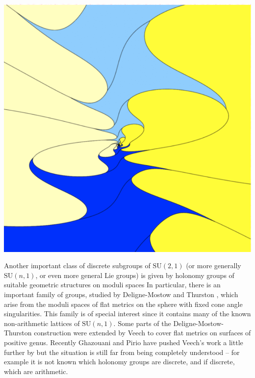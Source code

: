 \documentclass[14pt,fleqn]{article}
\begin{document}
\begin{center}
\includegraphics[scale=.15]{cplx_hyp.png} 
\end{center}


Another important class of discrete subgroups of $\mathrm{SU}(2,1)$ (or more
generally $\mathrm{SU}(n,1)$, 
or even more general Lie groups) is given by
holonomy groups of suitable geometric structures on moduli spaces 
In particular,
there is an important family of groups,
studied by Deligne-Mostow \cite{delignemostow}   and Thurston \cite{thurstonshapes},
which arise from
the moduli spaces of flat metrics on the sphere with fixed cone angle singularities.
This family is of special interest 
since it contains many of the 
known non-arithmetic lattices of $\mathrm{SU}(n,1)$.
Some parts of the  Deligne-Mostow-Thurston construction 
were extended by 
Veech \cite{veech}  to cover flat metrics on surfaces of positive genus.
Recently Ghazouani and Pirio \cite{ghazouanipirio}
have  pushed Veech's work a little further by 
but
the situation is still far from being completely understood -- for example it is not known which
holonomy groups are discrete, and if discrete, which are arithmetic.
\end{document}
